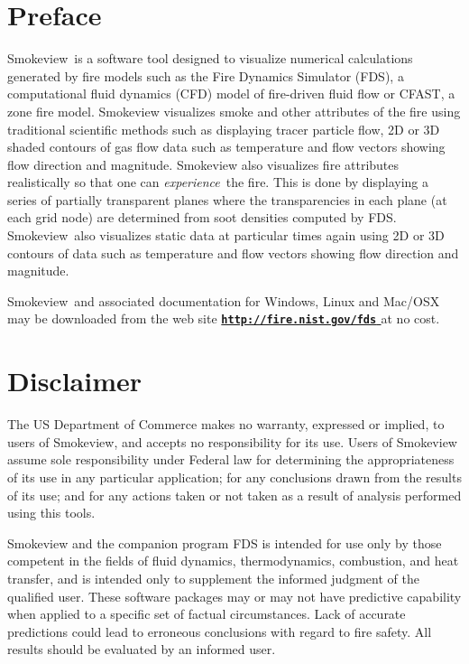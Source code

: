 \documentclass[11pt,twoside]{book}
\newcommand{\hhref}[1]{\href{#1}{{\tt #1}
}}
\newcommand{\fds}{{FDS}}
\newcommand{\Smokeview}{{Smokeview}}
\begin{document}
\chapter{Preface}
\Smokeview\ is a software tool designed to visualize numerical
calculations generated by fire models such as the Fire Dynamics Simulator (\fds),
a computational fluid dynamics (CFD) model of fire-driven fluid
flow or CFAST, a zone fire model. Smokeview visualizes smoke and other attributes of the fire
using traditional scientific methods such as displaying tracer
particle flow, 2D or 3D shaded contours of gas flow data such as
temperature and flow vectors showing flow direction and magnitude.
Smokeview also visualizes fire attributes realistically so that one can
{\em experience}\ the fire. This is done by displaying a series of
partially transparent planes where the transparencies in each
plane (at each grid node) are determined from soot densities
computed by FDS.  \Smokeview\ also visualizes static data at
particular times again using 2D or 3D contours of data such as
temperature and flow vectors showing flow direction and magnitude.

\Smokeview\ and associated
documentation for Windows, Linux and Mac/OSX may be downloaded from the web site {\bf
\hhref{http://fire.nist.gov/fds}} at no cost.


\chapter{Disclaimer}

The US Department of Commerce makes no warranty,
expressed or implied, to users of Smokeview, and accepts no
responsibility for its use. Users of Smokeview assume sole
responsibility under Federal law for determining the
appropriateness of its use in any particular application; for any
conclusions drawn from the results of its use; and for any actions
taken or not taken as a result of analysis performed using this
tools.

Smokeview and the companion program FDS is intended for use only
by those competent in the fields of fluid dynamics,
thermodynamics, combustion, and heat transfer, and is intended
only to supplement the informed judgment of the qualified user.
These software packages may or may not have predictive capability
when applied to a specific set of factual circumstances. Lack of
accurate predictions could lead to erroneous conclusions with
regard to fire safety. All results should be evaluated by an
informed user.
\end{document}
